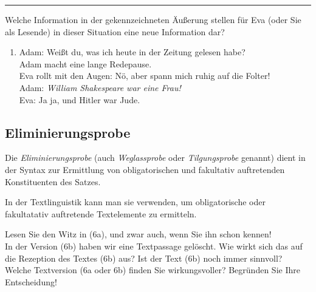 \documentclass[
  letterpaper,
]{scrbook}
\providecommand{\tightlist}{%
  \setlength{\itemsep}{0pt}\setlength{\parskip}{0pt}}\usepackage{longtable,booktabs,array}
\begin{document}
\begin{center}\rule{0.5\linewidth}{0.5pt}\end{center}

Welche Information in der gekennzeichneten Äußerung stellen für Eva
(oder Sie als Lesende) in dieser Situation eine neue Information dar?\\

\begin{enumerate}
\def\labelenumi{(\arabic{enumi})}
\setcounter{enumi}{4}
\tightlist
\item
  Adam: Weißt du, was ich heute in der Zeitung gelesen habe?\\
  Adam macht eine lange Redepause.\\
  Eva rollt mit den Augen: Nö, aber spann mich ruhig auf die Folter!\\
  Adam: \emph{William Shakespeare war eine Frau!}\\
  Eva: Ja ja, und Hitler war Jude.\\
\end{enumerate}

\hypertarget{eliminierungsprobe}{%
\subsection{Eliminierungsprobe}\label{eliminierungsprobe}}

Die \emph{Eliminierungsprobe} (auch \emph{Weglassprobe} oder
\emph{Tilgungsprobe} genannt) dient in der Syntax zur Ermittlung von
obligatorischen und fakultativ auftretenden Konstituenten des Satzes.

In der Textlinguistik kann man sie verwenden, um obligatorische oder
fakultatativ auftretende Textelemente zu ermitteln.

Lesen Sie den Witz in (6a), und zwar auch, wenn Sie ihn schon kennen!\\
In der Version (6b) haben wir eine Textpassage gelöscht. Wie wirkt sich
das auf die Rezeption des Textes (6b) aus? Ist der Text (6b) noch immer
sinnvoll? Welche Textversion (6a oder 6b) finden Sie wirkungsvoller?
Begründen Sie Ihre Entscheidung!
\end{document}
